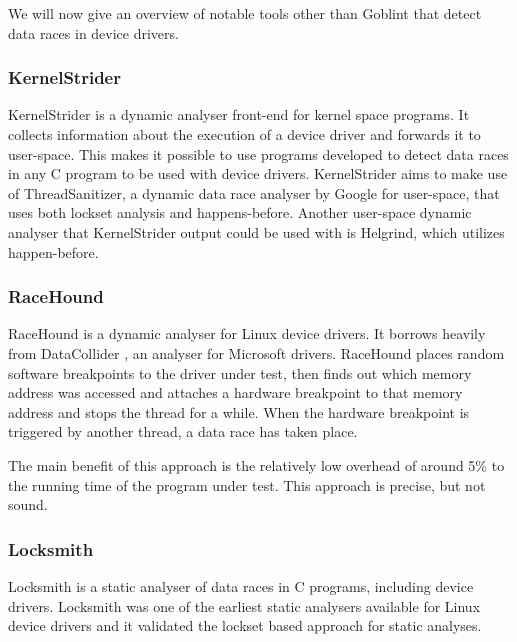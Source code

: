 \documentclass[..thesis.tex]{subfiles}
\begin{document}
We will now give an overview of notable tools other than Goblint that detect data races in device drivers.


\subsubsection{KernelStrider}

KernelStrider\cite{shatokhin_kernel} is a dynamic analyser front-end for kernel space programs. It collects information about the execution of a device driver and forwards it to user-space. This makes it possible to use programs developed to detect data races in any C program to be used with device drivers. KernelStrider aims to make use of ThreadSanitizer\cite{serebryany_threadsanitizer_2009}, a dynamic data race analyser by Google for user-space, that uses both lockset analysis and happens-before. Another user-space dynamic analyser that KernelStrider output could be used with is Helgrind,\cite{_helgrind,nethercote_valgrind_2007} which utilizes happen-before.


\subsubsection{RaceHound}

RaceHound\cite{komarov_implementation_2013} is a dynamic analyser for Linux device drivers. It borrows heavily from DataCollider \cite{erickson_effective_2010}, an analyser for Microsoft drivers. RaceHound places random software breakpoints to the driver under test, then finds out which memory address was accessed and attaches a hardware breakpoint to that memory address and stops the thread for a while. When the hardware breakpoint is triggered by another thread, a data race has taken place.

The main benefit of this approach is the relatively low overhead of around 5\% to the running time of the program under test. This approach is precise, but not sound.


\subsubsection{Locksmith}
Locksmith\cite{pratikakis_locksmith_2006} is a static analyser of data races in C programs, including device drivers. Locksmith was one of the earliest static analysers available for Linux device drivers and it validated the lockset based approach for static analyses. 
\end{document}
